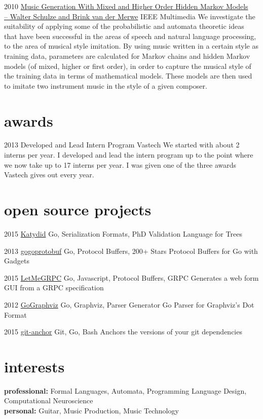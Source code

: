 \documentclass[]{friggeri-cv} %
\begin{document}
\begin{entrylist}

\entry
{2010}
{\href{http://doi.ieeecomputersociety.org/10.1109/MMUL.2010.44}{Music Generation With Mixed and Higher Order Hidden Markov Models\\
-- Walter Schulze and Brink van der Merwe}}
{IEEE Multimedia}
{We investigate the suitability of applying some of the probabilistic and automata theoretic ideas that have been successful in the areas of speech and natural language processing, to the area of musical style imitation. By using music written in a certain style as training data, parameters are calculated for Markov chains and hidden Markov models (of mixed, higher or ﬁrst order), in order to capture the musical style of the training data in terms of mathematical models.
These models are then used to imitate two instrument music in the style of a given composer.}

\end{entrylist}

\section{awards}

\begin{entrylist}

\entry
{2013}
{Developed and Lead Intern Program}
{Vastech}
{We started with about 2 interns per year. I developed and lead the intern program up to the point where we now take up to 17 interns per year.  I was given one of the three awards Vastech gives out every year.}

\end{entrylist}

\section{open source projects}

\begin{entrylist}

\entry
{2015}
{\href{https://github.com/katydid/katydid}{Katydid}}
{Go, Serialization Formats, PhD}
{Validation Language for Trees}

\entry
{2013}
{\href{https://github.com/gogo/protobuf}{gogoprotobuf}}
{Go, Protocol Buffers, 200+ Stars}
{Protocol Buffers for Go with Gadgets}

\entry
{2015}
{\href{https://github.com/gogo/letmegrpc}{LetMeGRPC}}
{Go, Javascript, Protocol Buffers, GRPC}
{Generates a web form GUI from a GRPC specification}

\entry
{2012}
{\href{https://github.com/awalterschulze/gographviz}{GoGraphviz}}
{Go, Graphviz, Parser Generator}
{Go Parser for Graphviz's Dot Format}

\entry
{2015}
{\href{https://github.com/awalterschulze/git-anchor}{git-anchor}}
{Git, Go, Bash}
{Anchors the versions of your git dependencies}

\end{entrylist}

\section{interests}

\textbf{professional:} Formal Languages, Automata, Programming Language Design, Computational Neuroscience \\
\textbf{personal:} Guitar, Music Production, Music Technology
\end{document}
